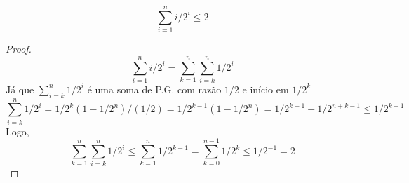 \documentclass[12pt]{article}
\newenvironment{problem}[2][Ex]{\begin{trivlist}
\item[\hskip \labelsep {\bfseries #1}\hskip \labelsep {\bfseries #2.}]}{\end{trivlist}}
\begin{document}
\begin{problem}{4.b}
$$\sum_{i=1}^{n} i/2^i \leq 2$$
\end{problem}

\begin{proof}
$$ \sum_{i=1}^{n} i/2^i = \sum_{k=1}^n \sum_{i=k}^n 1/2^i $$
Já que $\sum_{i=k}^n 1/2^i$ é uma soma de P.G. com razão $1/2$ e início em $1/2^k$
$$ \sum_{i=k}^n 1/2^i = 1/2^k(1-1/2^n)/(1/2) = 1/2^{k-1} (1-1/2^n) = 1/2^{k-1} - 1/2^{n+k-1} \leq 1/2^{k-1} $$
Logo,
$$ \sum_{k=1}^n \sum_{i=k}^n 1/2^i \leq \sum_{k=1}^n 1/2^{k-1} = \sum_{k=0}^{n-1} 1/2^{k} \leq 1/2^{-1} = 2 $$
\end{proof}
\end{document}
